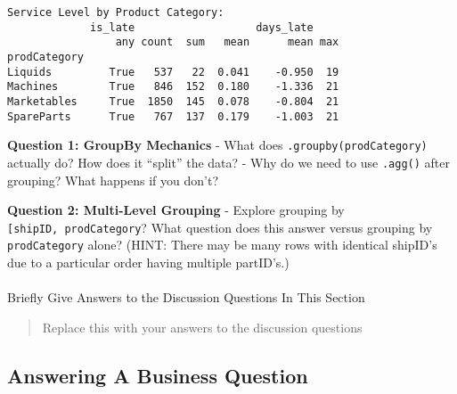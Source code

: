 \documentclass[
  letterpaper,
  DIV=11,
  numbers=noendperiod]{scrartcl}
\makeatletter
\let\oldparagraph\paragraph
\renewcommand{\paragraph}{
    \@ifstar
      \xxxParagraphStar
      \xxxParagraphNoStar
  }
\newcommand{\xxxParagraphStar}[1]{\oldparagraph*{#1}\mbox{}}
\newcommand{\xxxParagraphNoStar}[1]{\oldparagraph{#1}\mbox{}}
\makeatother
\begin{document}
\begin{verbatim}
Service Level by Product Category:
             is_late                   days_late    
                 any count  sum   mean      mean max
prodCategory                                        
Liquids         True   537   22  0.041    -0.950  19
Machines        True   846  152  0.180    -1.336  21
Marketables     True  1850  145  0.078    -0.804  21
SpareParts      True   767  137  0.179    -1.003  21
\end{verbatim}

\begin{tcolorbox}[enhanced jigsaw, colbacktitle=quarto-callout-important-color!10!white, opacitybacktitle=0.6, colframe=quarto-callout-important-color-frame, coltitle=black, left=2mm, titlerule=0mm, title=\textcolor{quarto-callout-important-color}{\faExclamation}\hspace{0.5em}{🤔 Discussion Questions: Split-Apply-Combine Mental Model}, bottomtitle=1mm, opacityback=0, arc=.35mm, rightrule=.15mm, colback=white, breakable, bottomrule=.15mm, toprule=.15mm, toptitle=1mm, leftrule=.75mm]

\textbf{Question 1: GroupBy Mechanics} - What does
\texttt{.groupby(\textquotesingle{}prodCategory\textquotesingle{})}
actually do? How does it ``split'' the data? - Why do we need to use
\texttt{.agg()} after grouping? What happens if you don't?

\textbf{Question 2: Multi-Level Grouping} - Explore grouping by
\texttt{{[}\textquotesingle{}shipID\textquotesingle{},\ \textquotesingle{}prodCategory\textquotesingle{}{]}}?
What question does this answer versus grouping by
\texttt{\textquotesingle{}prodCategory\textquotesingle{}} alone? (HINT:
There may be many rows with identical shipID's due to a particular order
having multiple partID's.)

\end{tcolorbox}

\paragraph{Briefly Give Answers to the Discussion Questions In This
Section}\label{briefly-give-answers-to-the-discussion-questions-in-this-section-6}

\begin{quote}
Replace this with your answers to the discussion questions
\end{quote}

\subsection{Answering A Business
Question}\label{answering-a-business-question}
\end{document}

